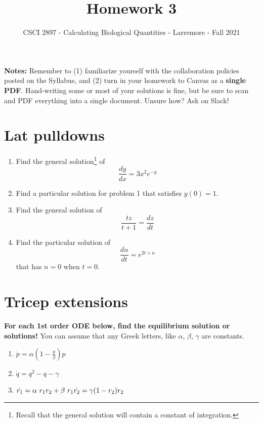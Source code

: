 \documentclass[11pt,onecolumn,superscriptaddress,notitlepage]{article}
\date{}
\begin{document}
\author{CSCI 2897 - Calculating Biological Quantities - Larremore - Fall 2021}
\title{Homework 3}
\maketitle

{\bf Notes:} Remember to (1) familiarize yourself with the collaboration policies posted on the Syllabus, and (2) turn in your homework to Canvas as a {\bf single PDF}. Hand-writing some or most of your solutions is fine, but be sure to scan and PDF everything into a single document. Unsure how? Ask on Slack! 

\section*{Lat pulldowns}

\begin{enumerate}
	\item Find the general solution\footnote{Recall that the general solution will contain a constant of integration.} of $$\frac{dy}{dx} = 3x^2e^{-y}$$
	\item Find a particular solution for problem 1 that satisfies $y(0)=1$.
	\item Find the general solution of $$\frac{tz}{t+1} = \frac{dz}{dt}$$
	\item Find the particular solution of $$\frac{dn}{dt} = e^{2t+n}$$ that has $n=0$ when $t=0$. 
\end{enumerate}

\section*{Tricep extensions} 

{\bf For each 1st order ODE below, find the equilibrium solution or solutions!} You can assume that any Greek letters, like $\alpha$, $\beta$, $\gamma$ are constants.

\begin{enumerate}[resume]
	\item $\dot{p} = \alpha(1-\frac{p}{\beta})p$
	\item $\dot{q} = q^2 - q - \gamma$
	\item $\dot{r_1} = \alpha\ r_1 r_2 + \beta\ r_1\\ \dot{r_2} = \gamma(1-r_2)r_2$
\end{enumerate}
\end{document}
